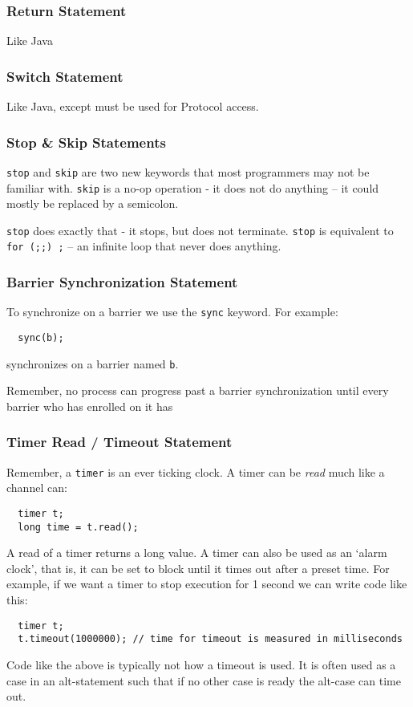\documentclass[pdflatex,11pt,letter]{article}
\begin{document}
\subsubsection{Return Statement}

Like Java

\subsubsection{Switch Statement}

Like Java, except must be used for Protocol access.

\subsubsection{Stop \& Skip Statements}

{\tt stop} and {\tt skip} are two new keywords that most programmers may not be familiar with. {\tt skip} is a no-op operation - it does not do anything -- it could mostly be replaced by a semicolon.

{\tt stop} does exactly that - it stops, but does not terminate. {\tt stop} is equivalent to {\tt for (;;) ;} -- an infinite loop that never does anything.

\subsubsection{Barrier Synchronization Statement}
\label{sec:barrierSync}

To synchronize on a barrier we use the {\tt sync} keyword. For example:
\begin{verbatim}
  sync(b);
\end{verbatim}
synchronizes on a barrier named {\tt b}.

Remember, no process can progress past a barrier synchronization until every barrier who has enrolled on it has 

\subsubsection{Timer Read / Timeout Statement}

Remember, a {\tt timer} is an ever ticking clock. A timer can be {\it read} much like a channel can:
\begin{verbatim}
  timer t;
  long time = t.read(); 
\end{verbatim}
A read of a timer returns a long value. A timer can also be used as an `alarm clock', that is, it can be set to block until it times out after a preset time. For example, if we want a timer to stop execution for 1 second we can write code like this:
\begin{verbatim}
  timer t;
  t.timeout(1000000); // time for timeout is measured in milliseconds 
\end{verbatim}
Code like the above is typically not how a timeout is used. It is often used as a case in an alt-statement such that if no other case is ready the alt-case can time out.
\end{document}
